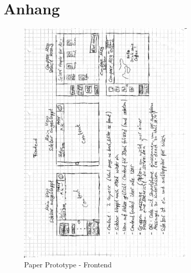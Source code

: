 \chapter*{Anhang}\label{Anhang}
\begin{figure}[h!]
  \centering
    \includegraphics[width=0.75\textwidth]{./img/paperPrototype1.png}
  \caption{Paper Prototype - Frontend}
  \label{img:paperPrototypeFrontend}
\end{figure}

